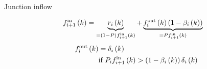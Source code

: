 \documentclass[xcolor=svgnames, english, smaller]{beamer}
\theoremstyle{plain}
\theoremstyle{definition}
\theoremstyle{plain}
\theoremstyle{plain}
\newcommand \Fontvi{\fontsize{8}{8}\selectfont}
\newcommand \systemDiagOffset{-1.8in}
\newcommand \systemDiagResizeMult{1.3}
\begin{document}
\begin{frame}{Junction inflow}

\Fontvi

\begin{figure}[t]
\hspace{\systemDiagOffset}
\resizebox{\systemDiagResizeMult\columnwidth}{!}{}
\label{fig:system}
\end{figure}

\begin{minipage}[t]{0.46\linewidth}
\begin{figure}[h]
\centering
\resizebox{0.8\columnwidth}{!}{
	
}
\label{fig:junctionBuffer-junctionFlowsInside}
\end{figure}
\end{minipage}\hfill
\begin{minipage}[t]{0.50\linewidth}
\begin{align}
&& f_{i+1}^{\text{in}}\left(k\right) & =  \underbrace{r_{i}\left(k\right)}_{=(1-P)f_{i+1}^{\text{in}}\left(k\right)} + \underbrace{f_{i}^{\text{out}}\left(k\right)\left(1-\beta_{i}\left(k\right)\right)}_{=Pf_{i+1}^{\text{in}}\left(k\right)}& \nonumber
\end{align}
\pause \begin{align}
&& f_{i}^{\text{out}}\left(k\right) &= \delta_{i}\left(k\right) \nonumber \\
&& &\text{if } P_{i}f_{i+1}^{\text{in}}\left(k\right) > \left(1-\beta_{i}\left(k\right)\right)\delta_{i}\left(k\right) \nonumber
\end{align}
\end{minipage}




\end{frame}
\end{document}
